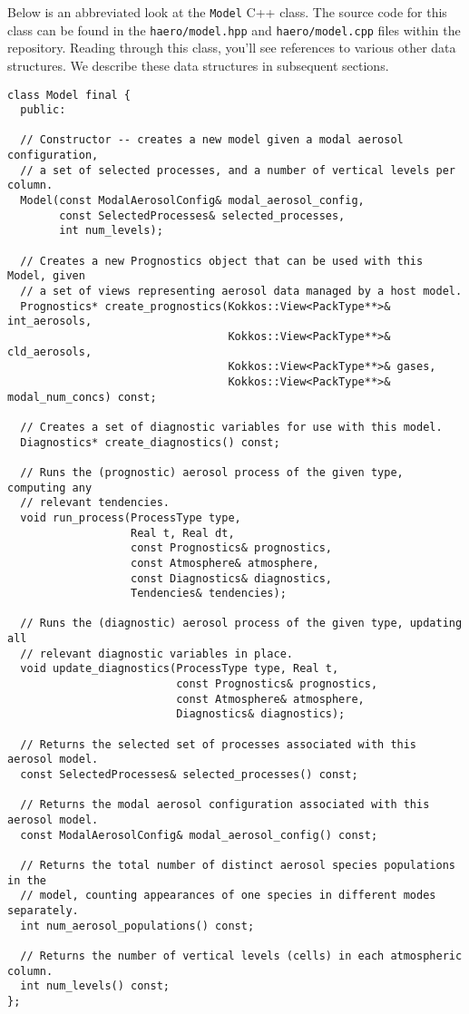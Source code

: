 Below is an abbreviated look at the \texttt{Model} C++ class. The source code for
this class can be found in the \texttt{haero/model.hpp} and
\texttt{haero/model.cpp} files within the repository. Reading through this class,
you'll see references to various other data structures. We describe these data
structures in subsequent sections.

\begin{lstlisting}
class Model final {
  public:

  // Constructor -- creates a new model given a modal aerosol configuration,
  // a set of selected processes, and a number of vertical levels per column.
  Model(const ModalAerosolConfig& modal_aerosol_config,
        const SelectedProcesses& selected_processes,
        int num_levels);

  // Creates a new Prognostics object that can be used with this Model, given
  // a set of views representing aerosol data managed by a host model.
  Prognostics* create_prognostics(Kokkos::View<PackType**>& int_aerosols,
                                  Kokkos::View<PackType**>& cld_aerosols,
                                  Kokkos::View<PackType**>& gases,
                                  Kokkos::View<PackType**>& modal_num_concs) const;

  // Creates a set of diagnostic variables for use with this model.
  Diagnostics* create_diagnostics() const;

  // Runs the (prognostic) aerosol process of the given type, computing any
  // relevant tendencies.
  void run_process(ProcessType type,
                   Real t, Real dt,
                   const Prognostics& prognostics,
                   const Atmosphere& atmosphere,
                   const Diagnostics& diagnostics,
                   Tendencies& tendencies);

  // Runs the (diagnostic) aerosol process of the given type, updating all
  // relevant diagnostic variables in place.
  void update_diagnostics(ProcessType type, Real t,
                          const Prognostics& prognostics,
                          const Atmosphere& atmosphere,
                          Diagnostics& diagnostics);

  // Returns the selected set of processes associated with this aerosol model.
  const SelectedProcesses& selected_processes() const;

  // Returns the modal aerosol configuration associated with this aerosol model.
  const ModalAerosolConfig& modal_aerosol_config() const;

  // Returns the total number of distinct aerosol species populations in the
  // model, counting appearances of one species in different modes separately.
  int num_aerosol_populations() const;

  // Returns the number of vertical levels (cells) in each atmospheric column.
  int num_levels() const;
};
\end{lstlisting}

